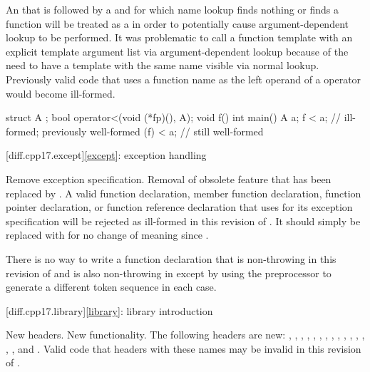 \change
An 
that is followed by a \tcode{<}
and for which name lookup
finds nothing or finds a function
will be treated as a 
in order to potentially cause argument-dependent lookup to be performed.
\rationale
It was problematic to call a function template
with an explicit template argument list
via argument-dependent lookup
because of the need to have a template with the same name
visible via normal lookup.
\effect
Previously valid code that uses a function name
as the left operand of a \tcode{<} operator
would become ill-formed.
\begin{example}
\begin{codeblock}
struct A {};
bool operator<(void (*fp)(), A);
void f() {}
int main() {
  A a;
  f < a;    // ill-formed; previously well-formed
  (f) < a;  // still well-formed
}
\end{codeblock}
\end{example}

[diff.cpp17.except]{\ref{except}: exception handling}

\change
Remove  exception specification.
\rationale
Removal of obsolete feature that has been replaced by .
\effect
A valid \CppXVII{} function declaration, member function declaration, function
pointer declaration, or function reference declaration that uses 
for its exception specification will be rejected as ill-formed in this
revision of \Cpp{}. It should simply be replaced with  for no
change of meaning since \CppXVII{}.
\begin{note}
There is no way to write a function declaration
that is non-throwing in this revision of \Cpp{}
and is also non-throwing in \CppIII{}
except by using the preprocessor to generate
a different token sequence in each case.
\end{note}

[diff.cpp17.library]{\ref{library}: library introduction}

\change
New headers.
\rationale
New functionality.
\effect
The following \Cpp{} headers are new:
,
,
,
,
,
,
,
,
,
,
,
,
,
,
, and
.
Valid \CppXVII{} code that  headers with these names may be
invalid in this revision of \Cpp{}.


